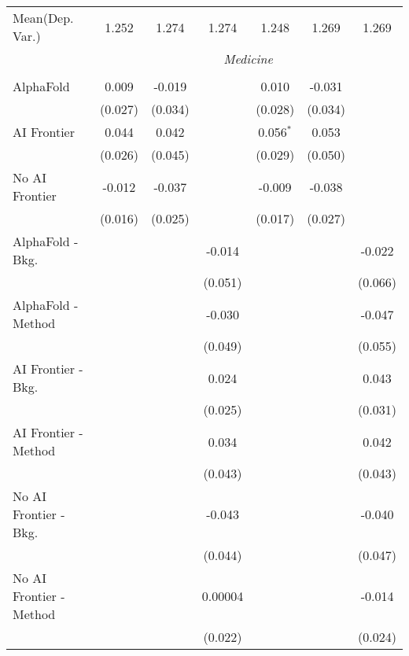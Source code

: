 \begin{tabular}{lcccccc}
Mean(Dep. Var.) & 1.252 & 1.274 & 1.274 & 1.248 & 1.269 & 1.269 \\
 & \multicolumn{6}{c}{\textit{Medicine}} \\ \\
   AlphaFold               & 0.009   & -0.019  &         & 0.010       & -0.031  &   \\   
                           & (0.027) & (0.034) &         & (0.028)     & (0.034) &   \\   
   AI Frontier             & 0.044   & 0.042   &         & 0.056$^{*}$ & 0.053   &   \\   
                           & (0.026) & (0.045) &         & (0.029)     & (0.050) &   \\   
   No AI Frontier          & -0.012  & -0.037  &         & -0.009      & -0.038  &   \\   
                           & (0.016) & (0.025) &         & (0.017)     & (0.027) &   \\   
   AlphaFold - Bkg.        &         &         & -0.014  &             &         & -0.022\\   
                           &         &         & (0.051) &             &         & (0.066)\\   
   AlphaFold - Method      &         &         & -0.030  &             &         & -0.047\\   
                           &         &         & (0.049) &             &         & (0.055)\\   
   AI Frontier - Bkg.      &         &         & 0.024   &             &         & 0.043\\   
                           &         &         & (0.025) &             &         & (0.031)\\   
   AI Frontier - Method    &         &         & 0.034   &             &         & 0.042\\   
                           &         &         & (0.043) &             &         & (0.043)\\   
   No AI Frontier - Bkg.   &         &         & -0.043  &             &         & -0.040\\   
                           &         &         & (0.044) &             &         & (0.047)\\   
   No AI Frontier - Method &         &         & 0.00004 &             &         & -0.014\\   
                           &         &         & (0.022) &             &         & (0.024)\\   

\end{tabular}
